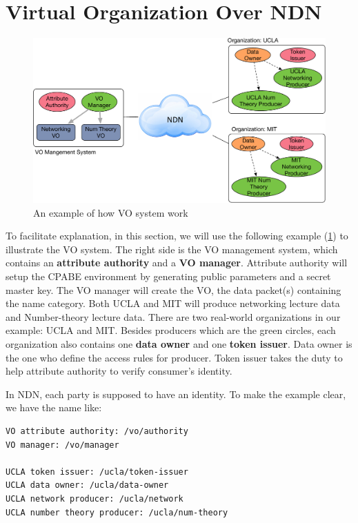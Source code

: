 \section{Virtual Organization Over NDN}

\begin{figure}[t]
  \centering
  \includegraphics[scale=0.5]{figures/example}
  \vspace{-3mm}
  \caption{An example of how VO system work}
  \label{fig:example}
\end{figure}

To facilitate explanation, in this section, we will use the following example (\ref{fig:example}) to illustrate the VO system.
The right side is the VO management system, which contains an \textbf{attribute authority} and a \textbf{VO manager}.
Attribute authority will setup the CPABE environment by generating public parameters and a secret master key.
The VO manager will create the VO, the data packet(s) containing the name category.
Both UCLA and MIT will produce networking lecture data and Number-theory lecture data.
There are two real-world organizations in our example: UCLA and MIT.
Besides producers which are the green circles, each organization also contains one \textbf{data owner} and one \textbf{token issuer}.
Data owner is the one who define the access rules for producer.
Token issuer takes the duty to help attribute authority to verify consumer's identity.

In NDN, each party is supposed to have an identity.
To make the example clear, we have the name like:

\begin{verbatim}
VO attribute authority: /vo/authority
VO manager: /vo/manager

UCLA token issuer: /ucla/token-issuer
UCLA data owner: /ucla/data-owner
UCLA network producer: /ucla/network
UCLA number theory producer: /ucla/num-theory
\end{verbatim}

